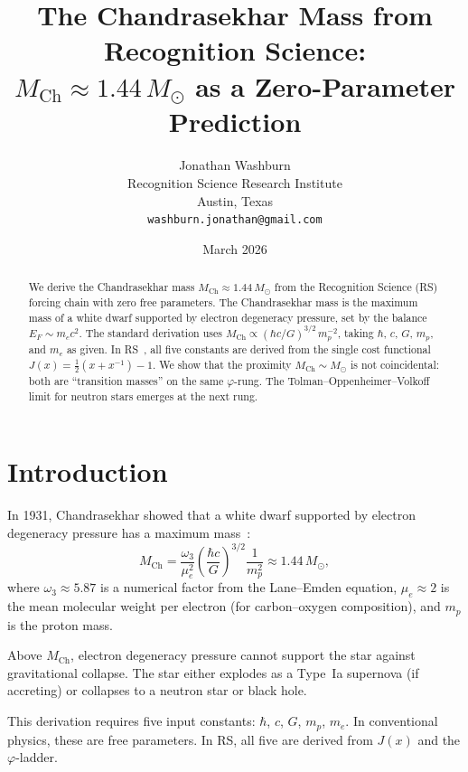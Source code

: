 \documentclass[12pt,a4paper]{article}
\title{The Chandrasekhar Mass from Recognition Science:\\
$M_{\mathrm{Ch}} \approx 1.44\,M_\odot$ as a Zero-Parameter
Prediction}
\author{Jonathan Washburn\\
Recognition Science Research Institute\\
Austin, Texas\\
\texttt{washburn.jonathan@gmail.com}}
\date{March 2026}
\theoremstyle{definition}
\theoremstyle{remark}
\begin{document}
\maketitle

\begin{abstract}
We derive the Chandrasekhar mass
$M_{\mathrm{Ch}} \approx 1.44\,M_\odot$ from the Recognition
Science (RS) forcing chain with zero free parameters.  The
Chandrasekhar mass is the maximum mass of a white dwarf supported
by electron degeneracy pressure, set by the balance
$E_F \sim m_e c^2$.  The standard derivation uses
$M_{\mathrm{Ch}} \propto (\hbar c/G)^{3/2}\,m_p^{-2}$, taking
$\hbar$, $c$, $G$, $m_p$, and $m_e$ as given.  In RS~\cite{RS_Axioms}, all five
constants are derived from the single cost functional
$J(x) = \tfrac{1}{2}(x + x^{-1}) - 1$.  We show that the
proximity $M_{\mathrm{Ch}} \sim M_\odot$ is not coincidental:
both are ``transition masses'' on the same $\varphi$-rung.  The
Tolman--Oppenheimer--Volkoff limit for neutron stars emerges at
the next rung.
\end{abstract}

\section{Introduction}
\label{sec:intro}

In 1931, Chandrasekhar showed that a white dwarf supported by
electron degeneracy pressure has a maximum mass~\cite{Chandra1931}:
\begin{equation}
  M_{\mathrm{Ch}} = \frac{\omega_3}{\mu_e^2}
  \left(\frac{\hbar c}{G}\right)^{3/2}
  \frac{1}{m_p^2}
  \approx 1.44\,M_\odot,
  \label{eq:chandra}
\end{equation}
where $\omega_3 \approx 5.87$ is a numerical factor from the
Lane--Emden equation, $\mu_e \approx 2$ is the mean molecular
weight per electron (for carbon--oxygen composition), and
$m_p$ is the proton mass.

Above $M_{\mathrm{Ch}}$, electron degeneracy pressure cannot
support the star against gravitational collapse.  The star either
explodes as a Type~Ia supernova (if accreting) or collapses to a
neutron star or black hole.

This derivation requires five input constants:
$\hbar$, $c$, $G$, $m_p$, $m_e$.  In conventional physics, these
are free parameters.  In RS, all five are derived from $J(x)$ and
the $\varphi$-ladder.
\end{document}
